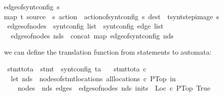 \begin{isabellebody}
{\isachardoublequoteopen}edge{\isacharunderscore}of{\isacharunderscore}synt{\isacharunderscore}config\ s\ {\isacharequal}\ \isanewline
map{\isacharparenleft}{\isasymlambda}\ t{\isachardot}\ {\isasymlparr}source\ {\isacharequal}\ s{\isacharcomma}\ action\ {\isacharequal}\ action{\isacharunderscore}of{\isacharunderscore}synt{\isacharunderscore}config\ s{\isacharcomma}\ dest\ {\isacharequal}\ t{\isasymrparr}{\isacharparenright}{\isacharparenleft}synt{\isacharunderscore}step{\isacharunderscore}image\ s{\isacharparenright}{\isachardoublequoteclose}\isanewline
{}\isamarkupfalse \ edges{\isacharunderscore}of{\isacharunderscore}nodes\ {\isacharcolon}{\isacharcolon}\ {\isachardoublequoteopen}synt{\isacharunderscore}config\ list\ {\isasymRightarrow}\ synt{\isacharunderscore}config\ edge\ list{\isachardoublequoteclose}\ \isanewline
\ \ {\isachardoublequoteopen}edges{\isacharunderscore}of{\isacharunderscore}nodes\ nds\ {\isacharequal}\ concat\ {\isacharparenleft}map\ edge{\isacharunderscore}of{\isacharunderscore}synt{\isacharunderscore}config\ nds{\isacharparenright}{\isachardoublequoteclose}\begin{isamarkuptext}we can define the translation function from statements to automata:\end{isamarkuptext}\isamarkuptrue {}\isamarkupfalse \ stmt{\isacharunderscore}to{\isacharunderscore}ta\ {\isacharcolon}{\isacharcolon}\ {\isachardoublequoteopen}stmt\ {\isasymRightarrow}\ synt{\isacharunderscore}config\ ta{\isachardoublequoteclose}\ \isanewline
\ \ {\isachardoublequoteopen}stmt{\isacharunderscore}to{\isacharunderscore}ta\ c\ {\isacharequal}\ \isanewline
\ \ {\isacharparenleft}let\ nds\ {\isacharequal}\ nodes{\isacharunderscore}of{\isacharunderscore}stmt{\isacharunderscore}locations\ {\isacharparenleft}all{\isacharunderscore}locations\ c\ PTop{\isacharparenright}\ in\isanewline
\ \ \ {\isasymlparr}\ nodes\ {\isacharequal}\ nds{\isacharcomma}\ edges\ {\isacharequal}\ edges{\isacharunderscore}of{\isacharunderscore}nodes\ nds{\isacharcomma}\ init{\isacharunderscore}s\ {\isacharequal}\ {\isacharparenleft}{\isacharparenleft}Loc\ c\ PTop{\isacharparenright}{\isacharcomma}\ True{\isacharparenright}\ {\isasymrparr}{\isacharparenright}{\isachardoublequoteclose}\isanewline
\isadelimproof
\endisadelimproof
\isatagproof
\endisatagproof
{\isafoldproof}\isadelimproof
\endisadelimproof
\isadelimproof
\endisadelimproof
\isatagproof
\endisatagproof
{\isafoldproof}\isadelimproof
\endisadelimproof
\isadelimproof
\endisadelimproof
\isatagproof
\endisatagproof

\end{isabellebody}
